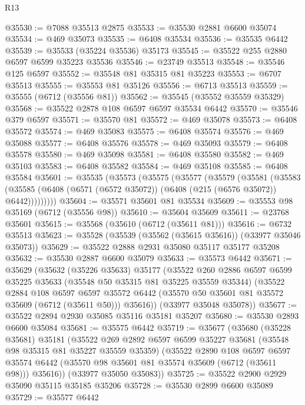 \begin{lexlean}{R13}
\begin{coremodule}
@35530 := @7088 @35513 @2875
@35533 := @35530 @2881 @6600 @35074
@35534 := @469 @35073
@35535 := @6408 @35534
@35536 := @35535 @6442
@35539 := @35533 (@35224 @35536) @35173
@35545 := @35522 @255 @2880 @6597 @6599 @35223 @35536
@35546 := @23749 @35513
@35548 := @35546 @125 @6597
@35552 := @35548 @81 @35315 @81 @35223
@35553 := @6707 @35513
@35555 := @35553 @81 @35126
@35556 := @6713 @35513
@35559 := @35555 (@6712 (@35556 @81))
@35562 := @35545 (@35552 @35559 @35329)
@35568 := @35522 @2878 @108 @6597 @6597 @35534 @6442
@35570 := @35546 @379 @6597
@35571 := @35570 @81
@35572 := @469 @35078
@35573 := @6408 @35572
@35574 := @469 @35083
@35575 := @6408 @35574
@35576 := @469 @35088
@35577 := @6408 @35576
@35578 := @469 @35093
@35579 := @6408 @35578
@35580 := @469 @35098
@35581 := @6408 @35580
@35582 := @469 @35103
@35583 := @6408 @35582
@35584 := @469 @35108
@35585 := @6408 @35584
@35601 := @35535
    (@35573
      (@35575
        (@35577
          (@35579
            (@35581
              (@35583
                (@35585 (@6408 (@6571 (@6572 @35072)) (@6408 (@215 (@6576 @35072)) @6442)))))))))
@35604 := @35571 @35601 @81 @35534
@35609 := @35553 @98 @35169 (@6712 (@35556 @98))
@35610 := @35604 @35609
@35611 := @23768 @35601
@35615 := @35568 (@35610 (@6712 (@35611 @81)))
@35616 := @6732 @35513
@35623 := @35528 (@35539 (@35562 (@35615 @35616)) (@33977 @35046 @35073))
@35629 := @35522 @2888 @2931 @35080 @35117 @35177 @35208
@35632 := @35530 @2887 @6600 @35079
@35633 := @35573 @6442
@35671 := @35629
    (@35632
      (@35226 @35633)
      @35177
      (@35522
        @260
        @2886
        @6597
        @6599
        @35225
        @35633
        (@35548 @50 @35315 @81 @35225 @35559 @35344)
        (@35522
          @2884
          @108
          @6597
          @6597
          @35572
          @6442
          (@35570 @50 @35601 @81 @35572 @35609 (@6712 (@35611 @50)))
          @35616))
      (@33977 @35048 @35078))
@35677 := @35522 @2894 @2930 @35085 @35116 @35181 @35207
@35680 := @35530 @2893 @6600 @35084
@35681 := @35575 @6442
@35719 := @35677
    (@35680
      (@35228 @35681)
      @35181
      (@35522
        @269
        @2892
        @6597
        @6599
        @35227
        @35681
        (@35548 @98 @35315 @81 @35227 @35559 @35359)
        (@35522
          @2890
          @108
          @6597
          @6597
          @35574
          @6442
          (@35570 @98 @35601 @81 @35574 @35609 (@6712 (@35611 @98)))
          @35616))
      (@33977 @35050 @35083))
@35725 := @35522 @2900 @2929 @35090 @35115 @35185 @35206
@35728 := @35530 @2899 @6600 @35089
@35729 := @35577 @6442

\end{coremodule}
\end{lexlean}
